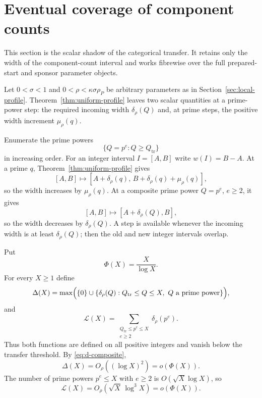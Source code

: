 \section{Eventual coverage of component counts}
\label{sec:scalar-finality}

This section is the scalar shadow of the categorical transfer.  It retains only the width of the component-count interval and works fibrewise over the full prepared-start and sponsor parameter objects.

Let $0<\sigma<1$ and $0<\rho<\kappa\sigma\rho_P$ be arbitrary parameters as in Section~\ref{sec:local-profile}.  Theorem~\ref{thm:uniform-profile} leaves two scalar quantities at a prime-power step: the required incoming width $\delta_\rho(Q)$ and, at prime steps, the positive width increment $\mu_\rho(q)$.

Enumerate the prime powers
\[
\{Q=p^e:Q\ge Q_{\mathrm{tr}}\}
\]
in increasing order.  For an integer interval $I=[A,B]$ write $w(I)=B-A$.  At a prime $q$, Theorem~\ref{thm:uniform-profile} gives
\begin{equation}\label{eq:prime-action}
[A,B]\longmapsto
[A+\delta_\rho(q),\,B+\delta_\rho(q)+\mu_\rho(q)],
\end{equation}
so the width increases by $\mu_\rho(q)$.  At a composite prime power $Q=p^e$, $e\ge2$, it gives
\begin{equation}\label{eq:composite-action}
[A,B]\longmapsto[A+\delta_\rho(Q),B],
\end{equation}
so the width decreases by $\delta_\rho(Q)$.  A step is available whenever the incoming width is at least $\delta_\rho(Q)$; then the old and new integer intervals overlap.

Put
\[
\Phi(X)=\frac X{\log X}.
\]
For every $X\ge1$ define
\[
\Delta(X)=
\max\Bigl(\{0\}\cup
\{\delta_\rho(Q):Q_{\mathrm{tr}}\le Q\le X,\ Q\text{ a prime power}\}\Bigr),
\]
and
\begin{equation}\label{eq:cumulative-debt}
\mathcal L(X)=
\sum_{\substack{Q_{\mathrm{tr}}\le p^e\le X\\ e\ge2}}\delta_\rho(p^e).
\end{equation}
Thus both functions are defined on all positive integers and vanish below the transfer threshold.  By \eqref{eq:d-composite},
\begin{equation}\label{eq:max-demand-subscale}
\Delta(X)=O_\rho((\log X)^2)=o(\Phi(X)).
\end{equation}
The number of prime powers $p^e\le X$ with $e\ge2$ is $O(\sqrt X\log X)$, so
\begin{equation}\label{eq:debt-subscale}
\mathcal L(X)=O_\rho(\sqrt X\,\log^3X)=o(\Phi(X)).
\end{equation}

